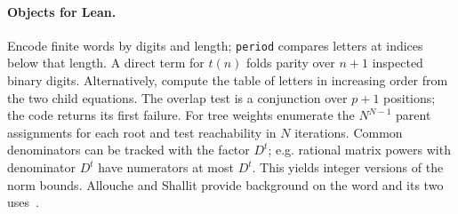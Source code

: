 \paragraph{Objects for Lean.} Encode finite words by digits and length; \texttt{period} compares letters at indices below that length. A direct term for $t(n)$ folds parity over $n+1$ inspected binary digits. Alternatively, compute the table of letters in increasing order from the two child equations. The overlap test is a conjunction over $p+1$ positions; the code returns its first failure. For tree weights enumerate the $N^{N-1}$ parent assignments for each root and test reachability in $N$ iterations. Common denominators can be tracked with the factor $D^t$; e.g. rational matrix powers with denominator $D^t$ have numerators at most $D^t$. This yields integer versions of the norm bounds. Allouche and Shallit provide background on the word and its two uses~\cite{thue}.
